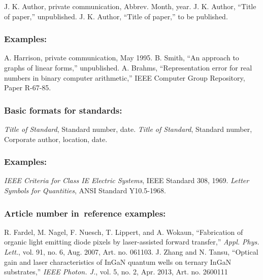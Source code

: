 \documentclass{IEEEoj}
\begin{document}
\begin{thebibliography}{00}
 J. K. Author, private communication, Abbrev. Month, year.
 J. K. Author, ``Title of paper,'' unpublished.
 J. K. Author, ``Title of paper,'' to be published.
\end{thebibliography}

\subsubsection*{Examples:}

\begin{thebibliography}{00}
 A. Harrison, private communication, May 1995.
 B. Smith, ``An approach to graphs of linear forms,'' unpublished.
 A. Brahms, ``Representation error for real numbers in binary computer arithmetic,'' IEEE Computer Group Repository, Paper R-67-85.
\end{thebibliography}

\subsubsection*{Basic formats for standards:}

\begin{thebibliography}{00}
 \textit{Title of Standard}, Standard number, date.
 \textit{Title of Standard}, Standard number, Corporate author, location, date.
\end{thebibliography}

\subsubsection*{Examples:}

\begin{thebibliography}{00}
 \emph{IEEE Criteria for Class IE Electric Systems}, IEEE Standard 308, 1969.
 \emph{Letter Symbols for Quantities}, ANSI Standard Y10.5-1968.
\end{thebibliography}

\subsubsection*{Article number in~reference examples:}

\begin{thebibliography}{00}
 R. Fardel, M. Nagel, F. Nuesch, T. Lippert, and A. Wokaun, ``Fabrication of organic light emitting diode pixels by laser-assisted forward transfer,'' \textit{Appl. Phys. Lett.}, vol. 91, no. 6, Aug. 2007, Art. no. 061103.
 J. Zhang and N. Tansu, ``Optical gain and laser characteristics of InGaN quantum wells on ternary InGaN substrates,'' \textit{IEEE Photon. J.}, vol. 5, no. 2, Apr. 2013, Art. no. 2600111
\end{thebibliography}
\end{document}
